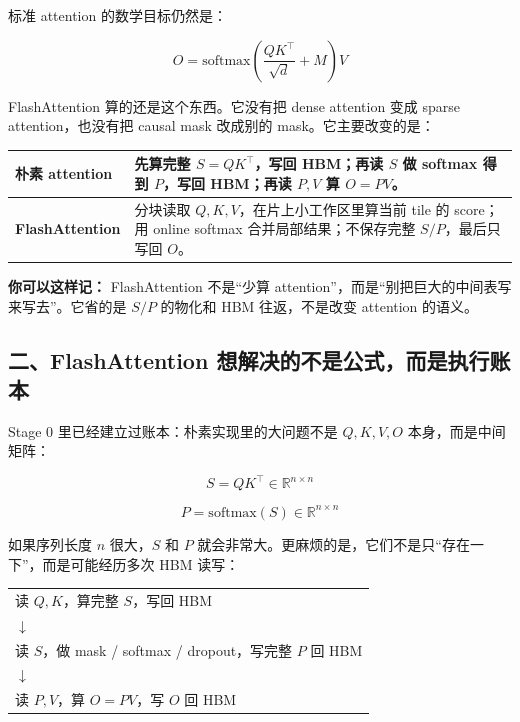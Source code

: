标准 attention 的数学目标仍然是：

\[
O=\mathrm{softmax}\left(\frac{QK^\top}{\sqrt{d}}+M\right)V
\]

FlashAttention 算的还是这个东西。它没有把 dense attention 变成 sparse attention，也没有把 causal mask 改成别的 mask。它主要改变的是：

\begin{center}
{\small
\begin{tabular}{p{4.1cm}p{8.6cm}}
\hline
\textbf{朴素 attention} & 先算完整 $S=QK^\top$，写回 HBM；再读 $S$ 做 softmax 得到 $P$，写回 HBM；再读 $P,V$ 算 $O=PV$。 \\
\hline
\textbf{FlashAttention} & 分块读取 $Q,K,V$，在片上小工作区里算当前 tile 的 score；用 online softmax 合并局部结果；不保存完整 $S/P$，最后只写回 $O$。 \\
\hline
\end{tabular}
}
\end{center}

\begin{intubox}
\textbf{你可以这样记：} FlashAttention 不是“少算 attention”，而是“别把巨大的中间表写来写去”。它省的是 $S/P$ 的物化和 HBM 往返，不是改变 attention 的语义。
\end{intubox}

\subsection{二、FlashAttention 想解决的不是公式，而是执行账本}

Stage 0 里已经建立过账本：朴素实现里的大问题不是 $Q,K,V,O$ 本身，而是中间矩阵：

\[
S=QK^\top \in \mathbb{R}^{n\times n}
\]

\[
P=\mathrm{softmax}(S) \in \mathbb{R}^{n\times n}
\]

如果序列长度 $n$ 很大，$S$ 和 $P$ 就会非常大。更麻烦的是，它们不是只“存在一下”，而是可能经历多次 HBM 读写：

\begin{center}
\begin{tabular}{p{13.2cm}}
\hline
读 $Q,K$，算完整 $S$，写回 HBM \\
$\downarrow$ \\
读 $S$，做 mask / softmax / dropout，写完整 $P$ 回 HBM \\
$\downarrow$ \\
读 $P,V$，算 $O=PV$，写 $O$ 回 HBM \\
\hline
\end{tabular}
\end{center}

